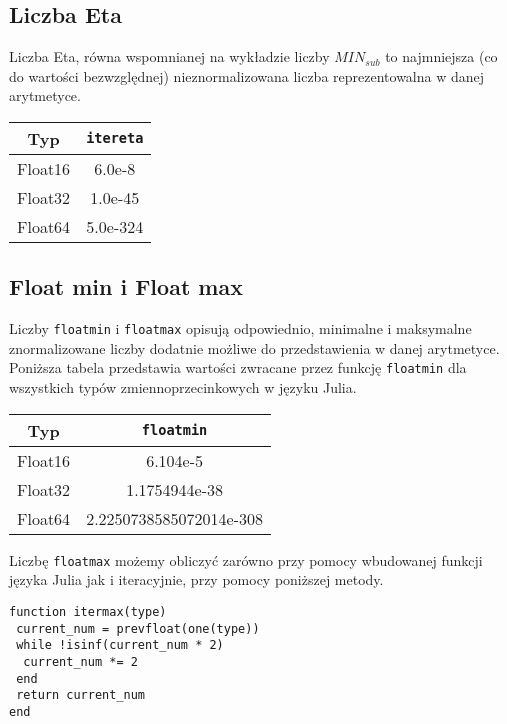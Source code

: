 \documentclass{article}
\begin{document}
\subsection{Liczba Eta}

Liczba Eta, równa wspomnianej na wykładzie liczby $MIN_{sub}$ to najmniejsza (co do wartości bezwzględnej) nieznormalizowana liczba reprezentowalna w danej arytmetyce.

\begin{center}
  \begin{tabular}{| c | c |}
    \hline
    Typ & \texttt{itereta} \\
    \hline
    Float16 & 6.0e-8 \\
    Float32 & 1.0e-45 \\
    Float64 & 5.0e-324 \\
    \hline
  \end{tabular}
\end{center}

\subsection{Float min i Float max}

Liczby \texttt{floatmin} i \texttt{floatmax} opisują odpowiednio, minimalne i maksymalne znormalizowane liczby dodatnie możliwe do przedstawienia w danej arytmetyce.
Poniższa tabela przedstawia wartości zwracane przez funkcję \texttt{floatmin} dla wszystkich typów zmiennoprzecinkowych w języku Julia.

\begin{center}
  \begin{tabular}{| c | c |}
    \hline
    Typ & \texttt{floatmin} \\
    \hline
    Float16 & 6.104e-5 \\
    Float32 & 1.1754944e-38 \\
    Float64 & 2.2250738585072014e-308 \\
    \hline
  \end{tabular}
\end{center}

Liczbę \texttt{floatmax} możemy obliczyć zarówno przy pomocy wbudowanej funkcji języka Julia jak i iteracyjnie, przy pomocy poniższej metody.

\begin{lstlisting}
function itermax(type)
 current_num = prevfloat(one(type))
 while !isinf(current_num * 2)
  current_num *= 2
 end
 return current_num
end
\end{lstlisting}
\end{document}
